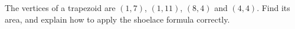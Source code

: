 The vertices of a trapezoid are $(1,7)$, $(1,11)$, $(8,4)$ and $(4,4)$. Find its area, and explain how to apply the shoelace formula correctly.
